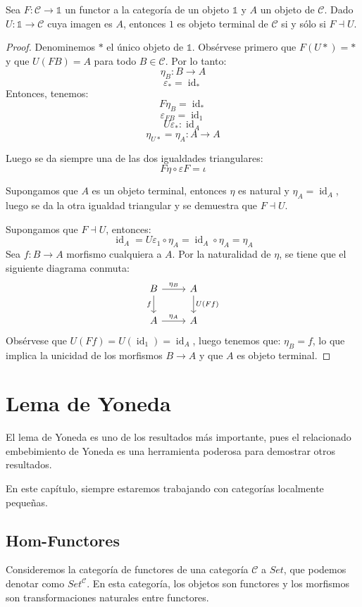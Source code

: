 \documentclass[12pt, twoside]{book}
\newcommand{\cat}{{\mathcal{C}}}
\newcommand{\Set}{{Set}}
\DeclareMathOperator{\id}{id}
\begin{document}
\begin{proposition}
Sea $F \colon \cat \to \mathbb{1}$ un functor a la categoría de un objeto $\mathbb{1}$ y $A$ un objeto de $\cat$.
Dado $U \colon \mathbb{1} \to \cat$ cuya imagen es $A$, entonces $1$ es objeto terminal de $\cat$ si y sólo si $F \dashv U$.
\end{proposition}
\begin{proof}
Denominemos $*$ el único objeto de $\mathbb{1}$.
Obsérvese primero que $F (U *) = *$ y que $U (F B) = A$ para todo $B \in \cat$. Por lo tanto:
\[ \eta_B \colon B \to A \]
\[ \varepsilon_* = \id_* \]
Entonces, tenemos:
\[ F\eta_B = \id_* \]
\[ \varepsilon_{F B} = \id_1\]
\[ U\varepsilon_* \colon \id_A \]
\[ \eta_{U *} = \eta_A \colon A \to A \]

Luego se da siempre una de las dos igualdades triangulares:
\[ F\eta \circ \varepsilon F = \iota \]

Supongamos que $A$ es un objeto terminal, entonces $\eta$ es natural y $\eta_A = \id_A$, luego se da la otra igualdad triangular y se demuestra que $F \dashv U$.

Supongamos que $F \dashv U$, entonces:
\[ \id_A = U \varepsilon_1 \circ \eta_A = \id_A \circ \eta_A = \eta_A \]
Sea $f \colon B \to A$ morfismo cualquiera a $A$.
Por la naturalidad de $\eta$, se tiene que el siguiente diagrama conmuta:
\[\begin{tikzcd}
B \arrow[r,"\eta_B"] \arrow[d,"f" left] & A \arrow[d,"U(F f)"]\\
A \arrow[r,"\eta_A"] & A
\end{tikzcd}\]
Obsérvese que $U (F f) = U (\id_1) = \id_A$, luego tenemos que: $\eta_B = f$, lo que implica la unicidad de los morfismos $B \to A$ y que $A$ es objeto terminal.
\end{proof}

\chapter{Lema de Yoneda}

El lema de Yoneda es uno de los resultados más importante, pues el relacionado embebimiento de Yoneda es una herramienta poderosa para demostrar otros resultados.

En este capítulo, siempre estaremos trabajando con categorías localmente pequeñas.

\section{Hom-Functores}
Consideremos la categoría de functores de una categoría $\cat$ a $\Set$, que podemos denotar como $\Set^\cat$.
En esta categoría, los objetos son functores y los morfismos son transformaciones naturales entre functores.
\end{document}
